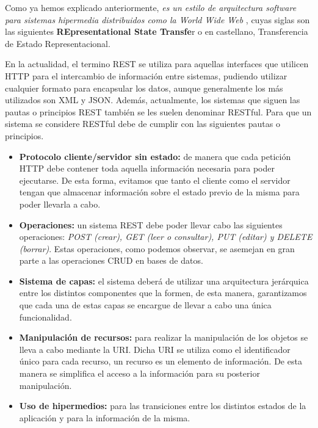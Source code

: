 Como ya hemos explicado anteriormente, \emph{es un estilo de arquitectura software para sistemas hipermedia distribuidos como la World Wide Web} \cite{wiki:rest2}, cuyas siglas son las siguientes \textbf{REpresentational State Transfe}r o en castellano, Transferencia de Estado Representacional.

En la actualidad, el termino REST se utiliza para aquellas interfaces que utilicen HTTP para el intercambio de información entre sistemas, pudiendo utilizar cualquier formato para encapsular los datos, aunque generalmente los más utilizados son XML y JSON. Además, actualmente, los sistemas que siguen las pautas o principios REST también se les suelen denominar RESTful.
Para que un sistema se considere RESTful debe de cumplir con las siguientes pautas o principios.

\begin{itemize}

	\item \textbf{Protocolo cliente/servidor sin estado:} de manera que cada petición HTTP debe contener toda aquella información necesaria para poder ejecutarse. De esta forma,  evitamos que tanto el cliente como el servidor tengan que almacenar información sobre el estado previo de la misma para poder llevarla a cabo.
	
	\item \textbf{Operaciones:} un sistema REST debe poder llevar cabo las siguientes operaciones: \emph{POST (crear), GET (leer o consultar), PUT (editar) y DELETE (borrar)}. Estas operaciones, como podemos observar, se asemejan en gran parte a las operaciones CRUD en bases de datos.
	
	\item \textbf{Sistema de capas:} el sistema deberá de utilizar una arquitectura jerárquica entre los distintos componentes que la formen, de esta manera, garantizamos que cada una de estas capas se encargue de llevar a cabo una única funcionalidad.
	
	\item \textbf{Manipulación de recursos:} para realizar la manipulación de los objetos se lleva a cabo mediante la URI. Dicha URI se utiliza como el identificador único para cada recurso, un recurso es un elemento de información. De esta manera se simplifica el acceso a la información para su posterior manipulación.
	
	\item \textbf{Uso de hipermedios:} para las transiciones entre los distintos estados de la aplicación y para la información de la misma.
	
\end{itemize}

\cite{wiki:rest}
 
